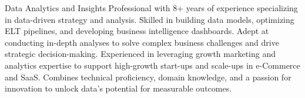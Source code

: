 \documentclass[10pt,a4paper,ragged2e,withhyper]{altacv}
\begin{document}



\makecvheader

\begin{adjustwidth}{0pt}{0pt}
\begin{justify}
Data Analytics and Insights Professional with 8+ years of experience specializing in data-driven strategy and analysis. Skilled in building data models, optimizing ELT pipelines, and developing business intelligence dashboards. Adept at conducting in-depth analyses to solve complex business challenges and drive strategic decision-making. Experienced in leveraging growth marketing and analytics expertise to support high-growth start-ups and scale-ups in e-Commerce and SaaS. Combines technical proficiency, domain knowledge, and a passion for innovation to unlock data’s potential for measurable outcomes.
\end{justify}
\end{adjustwidth}
\end{document}
